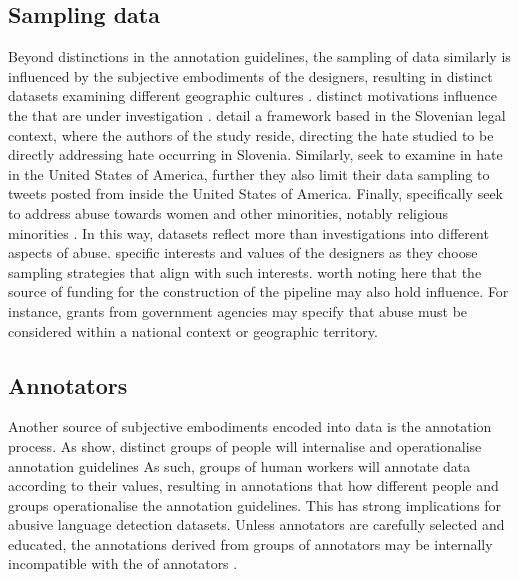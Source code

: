 \subsection{Sampling data}
Beyond distinctions in the annotation guidelines, the sampling of data similarly is influenced by the subjective embodiments of the designers, resulting in distinct datasets examining different geographic cultures \citep{Waseem:2018}.
 distinct motivations  influence the  that are under investigation \citep{Waseem:2018}.
 \citet{Fiser:2017} detail a framework based in the Slovenian legal context, where the authors of the study reside, directing the hate studied to be directly addressing hate occurring in Slovenia.
Similarly, \citet{Davidson:2017} seek to examine in hate in the United States of America, further they also limit their data sampling to tweets posted from inside the United States of America.
Finally, \citet{Waseem-Hovy:2016} specifically seek to address abuse towards women and other minorities, notably religious minorities .
In this way, datasets reflect more than investigations into different aspects of abuse.
 specific interests and values of the designers as they choose sampling strategies that align with such interests.
 worth noting here that the source of funding for the construction of the pipeline may also hold influence.
For instance, grants from government agencies may specify that abuse must be considered within a national context or geographic territory.

\subsection{Annotators}
Another source of subjective embodiments  encoded into  data is  the annotation process\citep{Waseem:2016}.
As \citet{Waseem:2016} show, distinct groups of people will internalise and operationalise annotation guidelines 
As such, groups of human workers will annotate data according to their values, resulting in annotations that  how different people and groups  operationalise the annotation guidelines.
This has strong implications for abusive language detection datasets.
Unless annotators are carefully selected and educated, the annotations derived from  groups of annotators may be internally incompatible with the  of annotators .


